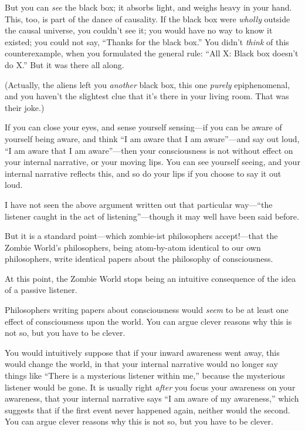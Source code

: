 {
 But you can \textit{see} the black box; it absorbs light, and
weighs heavy in your hand. This, too, is part of the dance of
causality. If the black box were \textit{wholly} outside the causal
universe, you couldn't see it; you would have no way to
know it existed; you could not say, ``Thanks for the
black box.'' You didn't
\textit{think} of this counterexample, when you formulated the general
rule: ``All X: Black box doesn't do
X.'' But it was there all along.}

{
 (Actually, the aliens left you \textit{another} black box, this
one \textit{purely} epiphenomenal, and you haven't the
slightest clue that it's there in your living room.
That was their joke.)}

{
 If you can close your eyes, and sense yourself sensing---if you
can be aware of yourself being aware, and think ``I am
aware that I am aware''---and say out loud,
``I am aware that I am
aware''---then your consciousness is not without
effect on your internal narrative, or your moving lips. You can see
yourself seeing, and your internal narrative reflects this, and so do
your lips if you choose to say it out loud.}

{
 I have not seen the above argument written out that particular
way---``the listener caught in the act of
listening''---though it may well have been said
before.}

{
 But it is a standard point{}---which zombie-ist philosophers
accept!---that the Zombie World's philosophers, being
atom-by-atom identical to our own philosophers, write identical papers
about the philosophy of consciousness.}

{
 At this point, the Zombie World stops being an intuitive
consequence of the idea of a passive listener.}

{
 Philosophers writing papers about consciousness would
\textit{seem} to be at least one effect of consciousness upon the
world. You can argue clever reasons why this is not so, but you have to
be clever.}

{
 You would intuitively suppose that if your inward awareness went
away, this would change the world, in that your internal narrative
would no longer say things like ``There is a
mysterious listener within me,'' because the
mysterious listener would be gone. It is usually right \textit{after}
you focus your awareness on your awareness, that your internal
narrative says ``I am aware of my
awareness,'' which suggests that if the first event
never happened again, neither would the second. You can argue clever
reasons why this is not so, but you have to be clever.}

